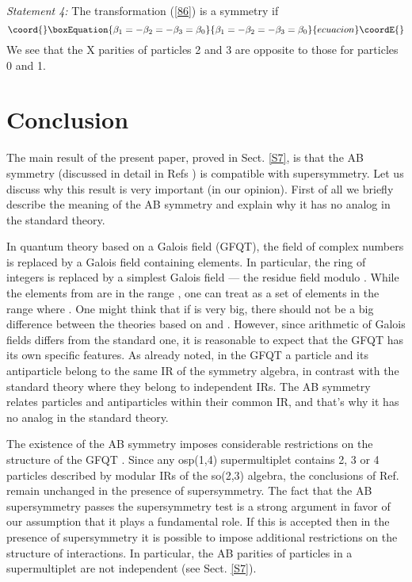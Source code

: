 \documentclass[a4paper,12pt]{article}%
\begin{document}
{\it Statement 4:} The transformation (\ref{86}) is
a symmetry if
\begin{equation}\coord{}\boxEquation{
\beta_1=-\beta_2=-\beta_3=\beta_0
\label{90}
}{
\beta_1=-\beta_2=-\beta_3=\beta_0
}{ecuacion}\coordE{}\end{equation}
We see that the X parities of particles 2 and 3 are
opposite to those for particles 0 and 1.

\section{Conclusion}
\label{S10}

The main result of the present paper, proved in Sect.
\ref{S7}, is that the AB symmetry (discussed in 
detail in Refs \cite{lev2,lev3}) is compatible with
supersymmetry. Let us discuss why this result is very
important (in our opinion). First of all we briefly
describe the meaning of the AB symmetry and explain 
why it has no analog in the standard theory.

In quantum theory based on a Galois field (GFQT),
the field of complex numbers is replaced by a Galois
field \coordHE{} containing \coordHE{} elements. In 
particular, the ring of integers \coordHE{} is replaced by
a simplest Galois field \coordHE{} --- the residue
field modulo \coordHE{}. While the elements from \coordHE{} are
in the range \coordHE{},
one can treat \coordHE{} as a set of elements in the range
\coordHE{} where \coordHE{}. One might
think that if \coordHE{} is very big, there should not be
a big difference between the theories based on \coordHE{} 
and \coordHE{}. However, since arithmetic of Galois fields
differs from the standard one, it is reasonable to
expect that the GFQT has its own specific features.
As already noted, in the GFQT a particle and its
antiparticle belong to the same IR of the symmetry
algebra, in contrast with the standard theory where
they belong to independent IRs. The AB symmetry 
relates particles and antiparticles within their
common IR, and that's why it has no analog in the
standard theory.

The existence of the AB symmetry imposes considerable
restrictions on the structure of the GFQT \cite{lev3}.
Since any osp(1,4) supermultiplet contains 2, 3 or 4
particles described by modular IRs of the so(2,3)
algebra, the conclusions of Ref. \cite{lev3} remain
unchanged in the presence of supersymmetry. The fact
that the AB supersymmetry passes the supersymmetry test
is a strong argument in favor of our assumption that
it plays a fundamental role. If this is accepted 
then in the presence
of supersymmetry it is possible to impose additional
restrictions on the structure of interactions. In
particular, the AB parities of particles in a
supermultiplet are not independent (see Sect. \ref{S7}).
\end{document}
